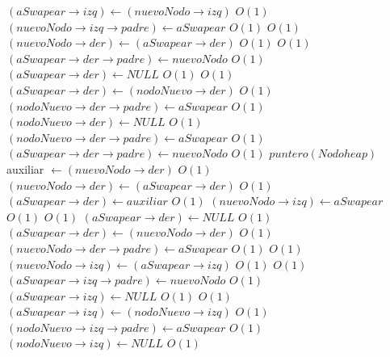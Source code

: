 \begin{Algoritmos}
\begin{algorithmic}[1]
							\Else
								\State $(aSwapear \rightarrow izq) \gets (nuevoNodo \rightarrow izq)$ \Comment $O(1)$
								\State $(nuevoNodo \rightarrow izq \rightarrow padre) \gets aSwapear$ \Comment $O(1)$
							\EndIf
							 \Comment $O(1)$
								\State $(nuevoNodo \rightarrow der) \gets (aSwapear \rightarrow der)$ \Comment $O(1)$
								 \Comment $O(1)$
								\State $(aSwapear \rightarrow der \rightarrow padre) \gets nuevoNodo$	 \Comment $O(1)$						
								\EndIf
								\State $(aSwapear \rightarrow der) \gets NULL$ \Comment $O(1)$
							\Else
								 \Comment $O(1)$
									\State $(aSwapear \rightarrow der) \gets (nodoNuevo \rightarrow der)$ \Comment $O(1)$
									\State $(nodoNuevo \rightarrow der \rightarrow padre) \gets aSwapear$ \Comment $O(1)$
									\State $(nodoNuevo \rightarrow der) \gets NULL$ \Comment $O(1)$
								\Else
									\State $(nodoNuevo \rightarrow der \rightarrow padre) \gets aSwapear$ \Comment $O(1)$
									\State $(aSwapear \rightarrow der \rightarrow padre) \gets nuevoNodo$ \Comment $O(1)$
									\State $puntero(Nodoheap)$ auxiliar $\gets (nuevoNodo \rightarrow der)$ \Comment $O(1)$
									\State $(nuevoNodo \rightarrow der) \gets (aSwapear \rightarrow der)$ \Comment $O(1)$
									\State $(aSwapear \rightarrow der) \gets auxiliar$ \Comment $O(1)$
								\EndIf
							\EndIf
						\State $(nuevoNodo \rightarrow izq) \gets aSwapear$ \Comment $O(1)$
					\Else
						 \Comment $O(1)$
								\State $(aSwapear \rightarrow der) \gets NULL$ \Comment $O(1)$
							\Else
								\State $(aSwapear \rightarrow der) \gets (nuevoNodo \rightarrow der)$ \Comment $O(1)$
								\State $(nuevoNodo \rightarrow der \rightarrow padre) \gets aSwapear$ \Comment $O(1)$
							\EndIf
							 \Comment $O(1)$
								\State $(nuevoNodo \rightarrow izq) \gets (aSwapear \rightarrow izq)$ \Comment $O(1)$
								 \Comment $O(1)$
									\State $(aSwapear \rightarrow izq \rightarrow padre) \gets nuevoNodo$	\Comment $O(1)$						
								\EndIf
								\State $(aSwapear \rightarrow izq) \gets NULL$ \Comment $O(1)$
							\Else
								 \Comment $O(1)$
									\State $(aSwapear \rightarrow izq) \gets (nodoNuevo \rightarrow izq)$ \Comment $O(1)$
									\State $(nodoNuevo \rightarrow izq \rightarrow padre) \gets aSwapear$ \Comment $O(1)$
									\State $(nodoNuevo \rightarrow izq) \gets NULL$ \Comment $O(1)$

\end{algorithmic}
\end{Algoritmos}
